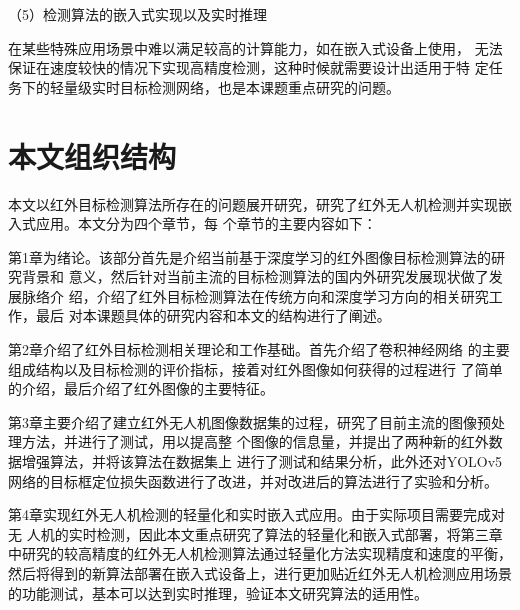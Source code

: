 （5）检测算法的嵌入式实现以及实时推理

在某些特殊应用场景中难以满足较高的计算能力，如在嵌入式设备上使用，
无法保证在速度较快的情况下实现高精度检测，这种时候就需要设计出适用于特
定任务下的轻量级实时目标检测网络，也是本课题重点研究的问题。

\section{本文组织结构}
本文以红外目标检测算法所存在的问题展开研究，研究了红外无人机检测并实现嵌入式应用。本文分为四个章节，每
个章节的主要内容如下：

第1章为绪论。该部分首先是介绍当前基于深度学习的红外图像目标检测算法的研究背景和
意义，然后针对当前主流的目标检测算法的国内外研究发展现状做了发展脉络介
绍，介绍了红外目标检测算法在传统方向和深度学习方向的相关研究工作，最后
对本课题具体的研究内容和本文的结构进行了阐述。

第2章介绍了红外目标检测相关理论和工作基础。首先介绍了卷积神经网络
的主要组成结构以及目标检测的评价指标，接着对红外图像如何获得的过程进行
了简单的介绍，最后介绍了红外图像的主要特征。

第3章主要介绍了建立红外无人机图像数据集的过程，研究了目前主流的图像预处理方法，并进行了测试，用以提高整
个图像的信息量，并提出了两种新的红外数据增强算法，并将该算法在数据集上
进行了测试和结果分析，此外还对YOLOv5网络的目标框定位损失函数进行了改进，并对改进后的算法进行了实验和分析。

第4章实现红外无人机检测的轻量化和实时嵌入式应用。由于实际项目需要完成对无
人机的实时检测，因此本文重点研究了算法的轻量化和嵌入式部署，将第三章中研究的较高精度的红外无人机检测算法通过轻量化方法实现精度和速度的平衡，然后将得到的新算法部署在嵌入式设备上，进行更加贴近红外无人机检测应用场景的功能测试，基本可以达到实时推理，验证本文研究算法的适用性。


